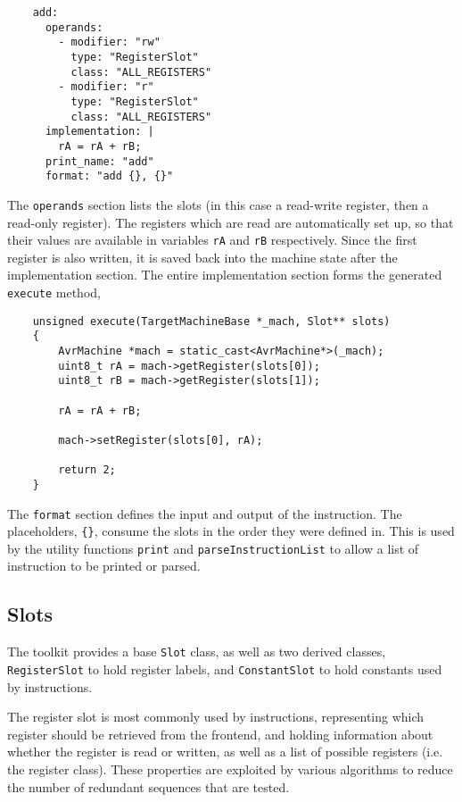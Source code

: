 \documentclass{article}
\begin{document}
\begin{verbatim}
    add:
      operands:
        - modifier: "rw"
          type: "RegisterSlot"
          class: "ALL_REGISTERS"
        - modifier: "r"
          type: "RegisterSlot"
          class: "ALL_REGISTERS"
      implementation: |
        rA = rA + rB;
      print_name: "add"
      format: "add {}, {}"
\end{verbatim}

\noindent
The \texttt{operands} section lists the slots (in this case a read-write register, then a read-only register). The registers which are read are automatically set up, so that their values are available in variables \texttt{rA} and \texttt{rB} respectively. Since the first register is also written, it is saved back into the machine state after the implementation section. The entire implementation section forms the generated \texttt{execute} method,

\begin{verbatim}
    unsigned execute(TargetMachineBase *_mach, Slot** slots)
    {
        AvrMachine *mach = static_cast<AvrMachine*>(_mach);
        uint8_t rA = mach->getRegister(slots[0]);
        uint8_t rB = mach->getRegister(slots[1]);

        rA = rA + rB;

        mach->setRegister(slots[0], rA);

        return 2;
    }
\end{verbatim}

The \texttt{format} section defines the input and output of the instruction. The placeholders, \texttt{\{\}}, consume the slots in the order they were defined in. This is used by the utility functions \texttt{print} and \texttt{parseInstructionList} to allow a list of instruction to be printed or parsed.

\subsection{Slots}

The toolkit provides a base \texttt{Slot} class, as well as two derived classes, \texttt{RegisterSlot} to hold register labels, and \texttt{ConstantSlot} to hold constants used by instructions.

The register slot is most commonly used by instructions, representing which register should be retrieved from the frontend, and holding information about whether the register is read or written, as well as a list of possible registers (i.e. the register class). These properties are exploited by various algorithms to reduce the number of redundant sequences that are tested.
\end{document}
